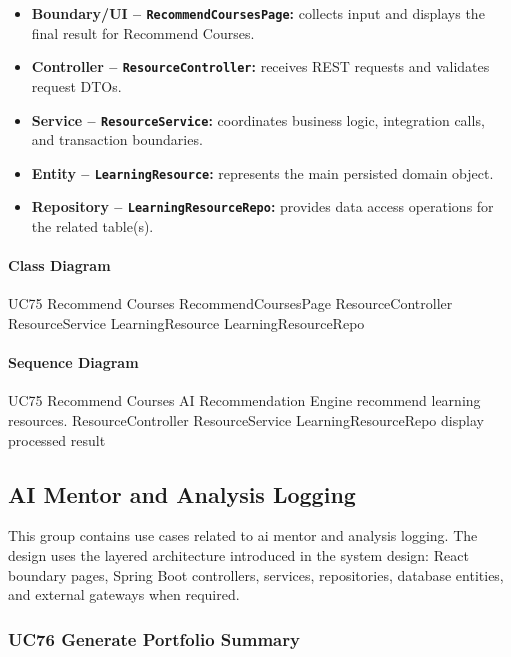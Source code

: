 \begin{itemize}
    \item \textbf{Boundary/UI -- \texttt{RecommendCoursesPage}:} collects input and displays the final result for Recommend Courses.
    \item \textbf{Controller -- \texttt{ResourceController}:} receives REST requests and validates request DTOs.
    \item \textbf{Service -- \texttt{ResourceService}:} coordinates business logic, integration calls, and transaction boundaries.
    \item \textbf{Entity -- \texttt{LearningResource}:} represents the main persisted domain object.
    \item \textbf{Repository -- \texttt{LearningResourceRepo}:} provides data access operations for the related table(s).
\end{itemize}

\paragraph{Class Diagram}

\ClassDiagram
{UC75 Recommend Courses}
{RecommendCoursesPage}
{ResourceController}
{ResourceService}
{LearningResource}
{LearningResourceRepo}

\paragraph{Sequence Diagram}

\SequenceDiagram
{UC75 Recommend Courses}
{AI Recommendation Engine}
{recommend learning resources.}
{ResourceController}
{ResourceService}
{LearningResourceRepo}
{display processed result}

\subsection{AI Mentor and Analysis Logging}

This group contains use cases related to ai mentor and analysis logging. The design uses the layered architecture introduced in the system design: React boundary pages, Spring Boot controllers, services, repositories, database entities, and external gateways when required.

\subsubsection{UC76 Generate Portfolio Summary}

